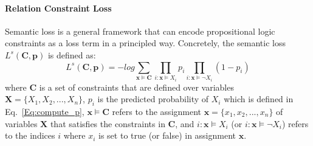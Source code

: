 \paragraph{Relation Constraint Loss}
Semantic loss is a general framework that can encode propositional logic constraints as a loss term in a principled way.
Concretely, the semantic loss $L^{s}(\bm{C}, \bm{p})$ is defined as:
\begin{equation}
\label{seq:semantic_loss}
	L^{s}(\bm{C}, \bm{p}) = -log\sum\limits_{\bm x\models\bm{C}}\prod\limits_{i:\bm x\models X_i}p_i\prod\limits_{i:\bm x\models \neg X_i}(1-p_i)
\end{equation}
where $\bm{C}$ is a set of constraints that are defined over variables $\bm{X}=\{X_1, X_2,...,X_n\}$,
$p_i$ is the predicted probability of $X_i$ which is defined in Eq.~\ref{Eq:compute_p},
$\bm x \models \bm{C}$ refers to the assignment $\bm{x} = \{x_1, x_2,...,x_n\}$ of variables $\bm X$ that satisfies the constraints in $\bm{C}$,
and $i:\bm x \models X_i$ (or $i:\bm x\models \neg X_i$) refers to the indices $i$ where $x_i$ is set to true (or false) in assignment $\bm x$.


